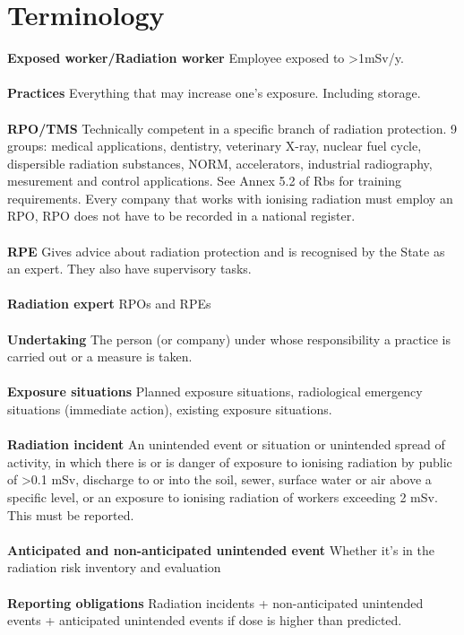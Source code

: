 \section{Terminology}
\textbf{Exposed worker/Radiation worker} Employee exposed to >1mSv/y. \\\\
\textbf{Practices} Everything that may increase one's exposure. Including storage.\\\\
\textbf{RPO/TMS} Technically competent in a specific branch of radiation protection. 9 groups: medical applications, dentistry, veterinary X-ray, nuclear fuel cycle, dispersible radiation substances, NORM, accelerators, industrial radiography, mesurement and control applications. See Annex 5.2 of Rbs for training requirements. Every company that works with ionising radiation must employ an RPO, RPO does not have to be recorded in a national register.\\\\
\textbf{RPE} Gives advice about radiation protection and is recognised by the State as an expert. They also have supervisory tasks.\\\\
\textbf{Radiation expert} RPOs and RPEs \\\\
\textbf{Undertaking} The person (or company) under whose responsibility a practice is carried out or a measure is taken.\\\\
\textbf{Exposure situations} Planned exposure situations, radiological emergency situations (immediate action), existing exposure situations.\\\\
\textbf{Radiation incident} An unintended event or situation or unintended spread of activity, in which there is or is danger of exposure to ionising radiation by public of >0.1 mSv, discharge to or into the soil, sewer, surface water or air above a specific level, or an exposure to ionising radiation of workers exceeding 2 mSv. This must be reported.\\\\
\textbf{Anticipated and non-anticipated unintended event} Whether it's in the radiation risk inventory and evaluation \\\\
\textbf{Reporting obligations} Radiation incidents + non-anticipated unintended events + anticipated unintended events if dose is higher than predicted.\\\\
